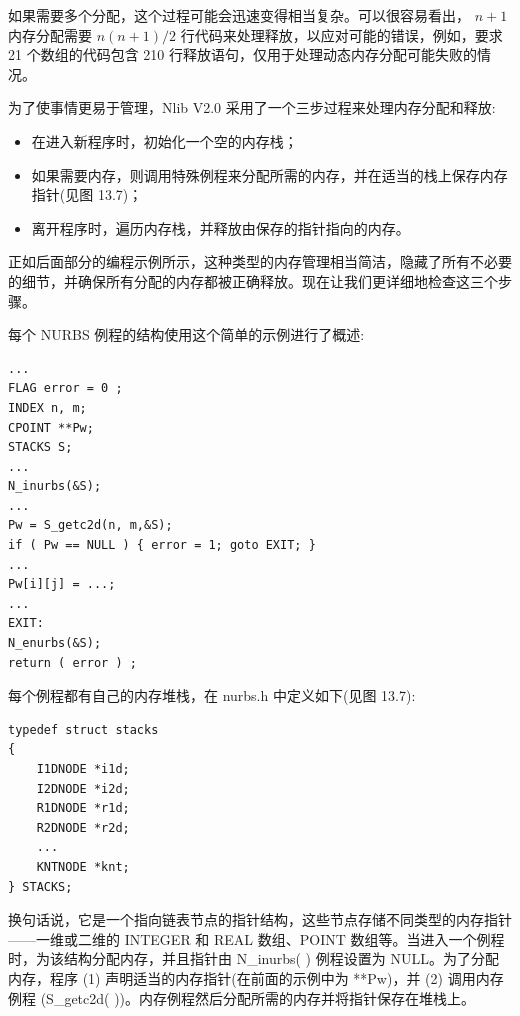 \documentclass[../main.tex]{subfiles}
\begin{document}
如果需要多个分配，这个过程可能会迅速变得相当复杂。可以很容易看出， \(n + 1\) 内存分配需要 \(n\left( {n + 1}\right) /2\) 行代码来处理释放，以应对可能的错误，例如，要求 21 个数组的代码包含 210 行释放语句，仅用于处理动态内存分配可能失败的情况。

为了使事情更易于管理，Nlib V2.0 采用了一个三步过程来处理内存分配和释放:

\begin{itemize}
\item 在进入新程序时，初始化一个空的内存栈；
\end{itemize}

\begin{itemize}
\item 如果需要内存，则调用特殊例程来分配所需的内存，并在适当的栈上保存内存指针(见图 13.7)；
\end{itemize}

\begin{itemize}
\item 离开程序时，遍历内存栈，并释放由保存的指针指向的内存。
\end{itemize}

正如后面部分的编程示例所示，这种类型的内存管理相当简洁，隐藏了所有不必要的细节，并确保所有分配的内存都被正确释放。现在让我们更详细地检查这三个步骤。

每个 NURBS 例程的结构使用这个简单的示例进行了概述:

\begin{verbatim}
...
FLAG error = 0 ;
INDEX n, m;
CPOINT **Pw;
STACKS S;
...
N_inurbs(&S);
...
Pw = S_getc2d(n, m,&S);
if ( Pw == NULL ) { error = 1; goto EXIT; }
...
Pw[i][j] = ...;
...
EXIT:
N_enurbs(&S);
return ( error ) ;
\end{verbatim}

每个例程都有自己的内存堆栈，在 nurbs.h 中定义如下(见图 13.7):

\begin{verbatim}
typedef struct stacks
{
    I1DNODE *i1d;
    I2DNODE *i2d;
    R1DNODE *r1d;
    R2DNODE *r2d;
    ...
    KNTNODE *knt;
} STACKS;
\end{verbatim}

换句话说，它是一个指向链表节点的指针结构，这些节点存储不同类型的内存指针——一维或二维的 INTEGER 和 REAL 数组、POINT 数组等。当进入一个例程时，为该结构分配内存，并且指针由 N\_inurbs(   ) 例程设置为 NULL。为了分配内存，程序 (1) 声明适当的内存指针(在前面的示例中为 **Pw)，并 (2) 调用内存例程 (S\_getc2d(   ))。内存例程然后分配所需的内存并将指针保存在堆栈上。
\end{document}
